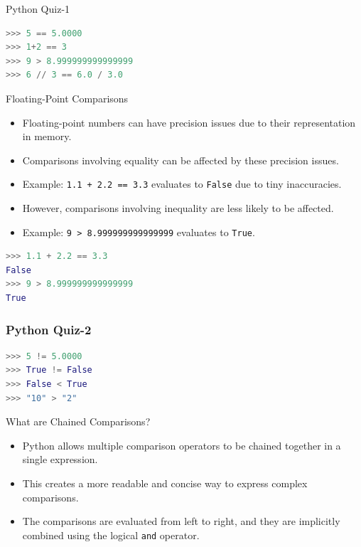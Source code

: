 \begin{frame}[fragile]{Python Quiz-1}
\begin{lstlisting}[style=colorful, language=Python]
>>> 5 == 5.0000
>>> 1+2 == 3 
>>> 9 > 8.999999999999999
>>> 6 // 3 == 6.0 / 3.0
\end{lstlisting}
\end{frame}

\begin{frame}[fragile]{Floating-Point Comparisons}
    \begin{itemize}
        \item Floating-point numbers can have precision issues due to their representation in memory.
        \item Comparisons involving equality can be affected by these precision issues.
        \item Example: \texttt{1.1 + 2.2 == 3.3} evaluates to \texttt{False} due to tiny inaccuracies.
        \item However, comparisons involving inequality are less likely to be affected.
        \item Example: \texttt{9 > 8.999999999999999} evaluates to \texttt{True}.
    \end{itemize}
    \begin{lstlisting}[style=colorful, language=Python]
>>> 1.1 + 2.2 == 3.3
False
>>> 9 > 8.999999999999999
True
    \end{lstlisting}
\end{frame}

\begin{frame}[fragile]
    \frametitle{Python Quiz-2}
    \begin{lstlisting}[style=colorful, language=Python]
>>> 5 != 5.0000
>>> True != False
>>> False < True
>>> "10" > "2"
    \end{lstlisting}
\end{frame}
\begin{frame}{What are Chained Comparisons?}
    \begin{itemize}
      \item Python allows multiple comparison operators to be chained together in a single expression.
      \item This creates a more readable and concise way to express complex comparisons.
      \item The comparisons are evaluated from left to right, and they are implicitly combined using the logical \texttt{and} operator.
    \end{itemize}
  \end{frame}
  
